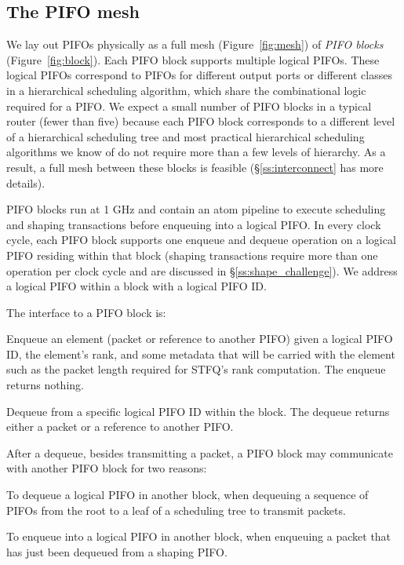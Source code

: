 \subsection{The PIFO mesh}
\label{ss:mesh}

We lay out PIFOs physically as a full mesh (Figure~\ref{fig:mesh}) of
{\em PIFO blocks} (Figure~\ref{fig:block}). Each PIFO block supports
multiple logical PIFOs. These logical PIFOs correspond to PIFOs for
different output ports or different classes in a
hierarchical scheduling algorithm, which share the combinational logic
required for a PIFO. We expect a small number of PIFO blocks in a
typical router (\eg fewer than five) because each PIFO block
corresponds to a different level of a hierarchical scheduling tree and
most practical hierarchical scheduling algorithms we know of do
  not require more than a few levels of hierarchy. As a result, a
full mesh between these blocks is feasible (\S\ref{ss:interconnect}
has more details).

PIFO blocks run at 1 GHz and contain an atom
pipeline to execute scheduling and shaping transactions before enqueuing into a
logical PIFO. In every clock cycle, each PIFO block supports one enqueue and
dequeue operation on a logical PIFO residing within that block
(shaping transactions require more than one operation per clock cycle and
are discussed in \S\ref{ss:shape_challenge}). We address a logical PIFO within
a block with a logical PIFO ID.

The interface to a PIFO block is:
\begin{CompactEnumerate}
\item Enqueue an element (packet or reference to another PIFO) given a
  logical PIFO ID, the element's rank, and some metadata that will be
  carried with the element such as the packet length required for
  STFQ's rank computation. The enqueue returns nothing.
\item Dequeue from a specific logical PIFO ID within the block. The dequeue
   returns either a packet or a reference to another PIFO.
\end{CompactEnumerate}

After a dequeue, besides transmitting a packet, a PIFO block may
communicate with another PIFO block for two reasons:
 \begin{CompactEnumerate}
 \item To dequeue a logical PIFO in another block, \eg when dequeuing a
   sequence of PIFOs from the root to a leaf of a scheduling tree to transmit
   packets.
 
 \item To enqueue into a logical PIFO in another block, \eg when
   enqueuing a packet that has just been dequeued from a shaping
   PIFO.
 \end{CompactEnumerate}

